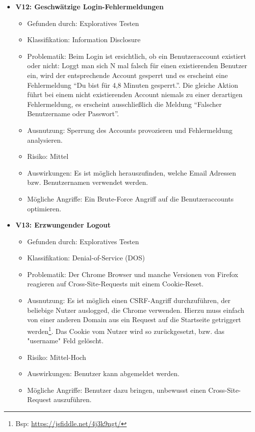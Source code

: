 \documentclass[12pt,DIV14,BCOR10mm,a4paper,parskip=half-,headsepline,headinclude,english,ngerman,bibliography=totocnumbered]{scrreprt}
\begin{document}
\begin{itemize}
  \hypertarget{vulnerability12}{}
  \item \textbf{V12: Geschwätzige Login-Fehlermeldungen}
  \begin{itemize}
  \item Gefunden durch: Exploratives Testen
  \item Klassifikation: Information Disclosure
  \item Problematik: Beim Login ist ersichtlich, ob ein Benutzeraccount existiert oder nicht: Loggt man sich N mal falsch für einen existierenden Benutzer ein, wird der entsprechende Account gesperrt und es erscheint eine Fehlermeldung \enquote{Du bist für 4,8 Minuten gesperrt.}. Die gleiche Aktion führt bei einem nicht existierenden Account niemals zu einer derartigen Fehlermeldung, es erscheint ausschließlich die Meldung \enquote{Falscher Benutzername oder Passwort}.
  \item Ausnutzung: Sperrung des Accounts provozieren und Fehlermeldung analysieren.
  \item Risiko: Mittel
  \item Auswirkungen: Es ist möglich herauszufinden, welche Email Adressen bzw. Benutzernamen verwendet werden.
  \item Mögliche Angriffe: Ein Brute-Force Angriff auf die Benutzeraccounts optimieren.
  \end{itemize}

  \hypertarget{vulnerability13}{}
  \item \textbf{V13: Erzwungender Logout}
  \begin{itemize}
  \item Gefunden durch: Exploratives Testen
  \item Klassifikation: Denial-of-Service (DOS)
  \item Problematik: Der Chrome Browser und manche Versionen von Firefox reagieren auf Cross-Site-Requests mit einem Cookie-Reset.
  \item Ausnutzung: Es ist möglich einen CSRF-Angriff durchzuführen, der beliebige Nutzer auslogged, die Chrome verwenden. Hierzu muss einfach von einer anderen Domain aus ein Request auf die Startseite getriggert werden\footnote{Bsp: \url{https://jsfiddle.net/4j3k9ngt/}}. Das Cookie vom Nutzer wird so zurückgesetzt, bzw. das "username" Feld gelöscht.
  \item Risiko: Mittel-Hoch
  \item Auswirkungen: Benutzer kann abgemeldet werden.
  \item Mögliche Angriffe: Benutzer dazu bringen, unbewusst einen Cross-Site-Request auszuführen.
  \end{itemize}


\end{itemize}
\end{document}
